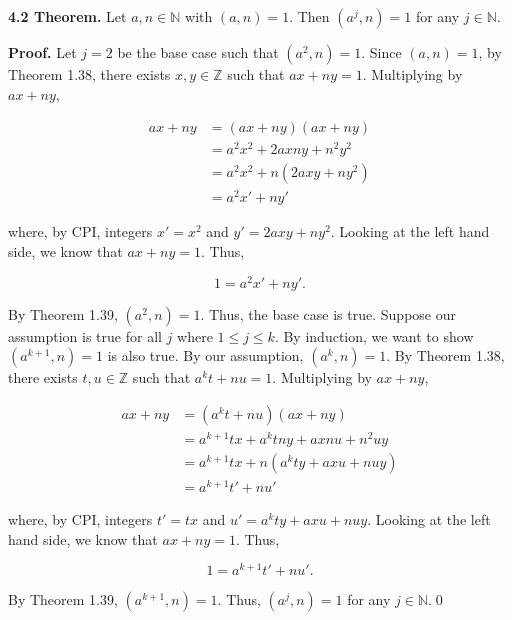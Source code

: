 \documentclass[12pt]{article}
\begin{document}
\noindent\textbf{4.2 Theorem.} Let $a,n\in\mathbb{N}$ with $(a,n)=1$. Then $(a^j,n)=1$ for any $j\in\mathbb{N}$.

\bigskip

\noindent\textbf{Proof.} Let $j=2$ be the base case such that $(a^2,n)=1$. Since $(a,n)=1$, by Theorem 1.38, there exists $x,y\in\mathbb{Z}$ such that $ax+ny=1$. Multiplying by $ax+ny$,

\begin{align*}
ax+ny &= (ax+ny)(ax+ny)\\
&= a^2x^2 +2axny +n^2y^2\\
&= a^2x^2 + n(2axy+ny^2)\\
&= a^2x' + ny'
\end{align*}

\noindent where, by CPI, integers $x'=x^2$ and $y'=2axy+ny^2$. Looking at the left hand side, we know that $ax+ny=1$. Thus,

\begin{equation*}
1=a^2x'+ny'.
\end{equation*}

\noindent By Theorem 1.39, $(a^2,n)=1$. Thus, the base case is true. Suppose our assumption is true for all $j$ where $1 \leq j \leq k$. By induction, we want to show $(a^{k+1},n)=1$ is also true. By our assumption, $(a^k,n)=1$. By Theorem 1.38, there exists $t,u\in\mathbb{Z}$ such that $a^kt+nu=1$. Multiplying by $ax+ny$,

\begin{align*}
ax+ny &= (a^kt+nu)(ax+ny)\\
&= a^{k+1}tx +a^ktny + axnu +n^2uy\\
&= a^{k+1}tx + n(a^kty+axu+nuy)\\
&= a^{k+1}t' + nu'
\end{align*}

\noindent where, by CPI, integers $t'=tx$ and $u'=a^kty+axu+nuy$. Looking at the left hand side, we know that $ax+ny=1$. Thus,

\begin{equation*}
1=a^{k+1}t' + nu'.
\end{equation*}

\noindent By Theorem 1.39, $(a^{k+1},n)=1$. Thus, $(a^j,n)=1$ for any $j\in\mathbb{N}$.\qed
\end{document}
